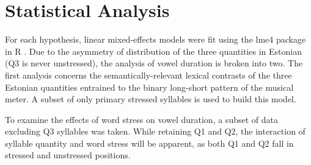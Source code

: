 \section{Statistical Analysis} 
For each hypothesis, linear mixed-effects models were fit using the lme4 package in R \citep{lme4,r2022}. Due to the asymmetry of distribution of the three quantities in Estonian (Q3 is never unstressed), the analysis of vowel duration is broken into two. The first analysis concerns the semantically-relevant lexical contrasts of the three Estonian quantities entrained to the binary long-short pattern of the musical meter. A subset of only primary stressed syllables is used to build this model. 

\lipsum[2-3]


To examine the effects of word stress on vowel duration, a subset of data excluding Q3 syllables was taken. While retaining Q1 and Q2, the interaction of syllable quantity and word stress will be apparent, as both Q1 and Q2 fall in stressed and unstressed positions. 

\lipsum[2-3]


